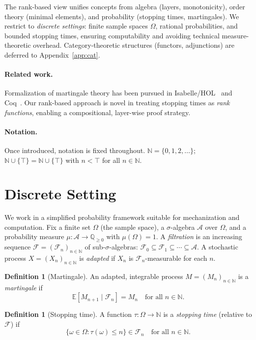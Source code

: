 \documentclass[11pt]{article}
\theoremstyle{definition}
\newtheorem{definition}[theorem]{Definition}
\theoremstyle{remark}
\newcommand{\Filtration}{\mathcal{F}}
\newcommand{\NN}{\mathbb{N}}
\newcommand{\QQ}{\mathbb{Q}}
\newcommand{\EE}{\mathbb{E}}
\newcommand{\WithTop}[1]{#1 \cup \{\top\}}
\begin{document}
The rank-based view unifies concepts from algebra (layers, monotonicity), order theory (minimal elements), and probability (stopping times, martingales).
We restrict to \emph{discrete settings}: finite sample spaces $\Omega$, rational probabilities, and bounded stopping times, ensuring computability and avoiding technical measure-theoretic overhead.
Category-theoretic structures (functors, adjunctions) are deferred to Appendix~\ref{app:cat}.

\paragraph{Related work.}
Formalization of martingale theory has been pursued in Isabelle/HOL~\cite{isabelle-ost} and Coq~\cite{coq-prob}.
Our rank-based approach is novel in treating stopping times as \emph{rank functions}, enabling a compositional, layer-wise proof strategy.

\paragraph{Notation.}
Once introduced, notation is fixed throughout.
$\NN = \{0,1,2,\ldots\}$; $\WithTop{\NN} = \NN \cup \{\top\}$ with $n < \top$ for all $n \in \NN$.

\section{Discrete Setting}
\label{sec:discrete}

We work in a simplified probability framework suitable for mechanization and computation.
Fix a finite set $\Omega$ (the sample space), a $\sigma$-algebra $\mathcal{A}$ over $\Omega$, and a probability measure $\mu: \mathcal{A} \to \QQ_{\geq 0}$ with $\mu(\Omega) = 1$.
A \emph{filtration} is an increasing sequence $\Filtration = (\Filtration_n)_{n \in \NN}$ of sub-$\sigma$-algebras: $\Filtration_0 \subseteq \Filtration_1 \subseteq \cdots \subseteq \mathcal{A}$.
A stochastic process $X = (X_n)_{n \in \NN}$ is \emph{adapted} if $X_n$ is $\Filtration_n$-measurable for each $n$.

\begin{definition}[Martingale]
\label{def:martingale}
An adapted, integrable process $M = (M_n)_{n \in \NN}$ is a \emph{martingale} if
\[
\EE[M_{n+1} \mid \Filtration_n] = M_n \quad \text{for all } n \in \NN.
\]
\end{definition}

\begin{definition}[Stopping time]
\label{def:stopping-time}
A function $\tau: \Omega \to \NN$ is a \emph{stopping time} (relative to $\Filtration$) if
\[
\{\omega \in \Omega : \tau(\omega) \leq n\} \in \Filtration_n \quad \text{for all } n \in \NN.
\]
\end{definition}
\end{document}
